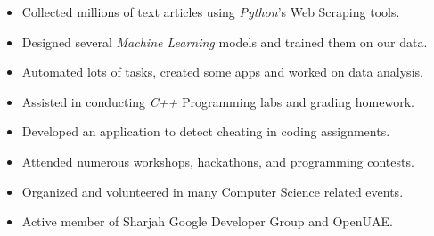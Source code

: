 \documentclass[10pt,a4paper]{altacv}
\begin{document}
\divider

\begin{itemize}
  \item Collected millions of text articles using \emph{Python}'s Web Scraping tools.
  \item Designed several \emph{Machine Learning} models and trained them on our data.
  \item Automated lots of tasks, created some apps and worked on data analysis.
\end{itemize}

\divider

\begin{itemize}
  \item Assisted in conducting \emph{C++} Programming labs and grading homework.
  \item Developed an application to detect cheating in coding assignments.
\end{itemize}
\smallskip


\projectssection
\smallskip

\begin{itemize}
  \item Attended numerous workshops, hackathons, and programming contests.
  \item Organized and volunteered in many Computer Science related events.
  \item Active member of Sharjah Google Developer Group and OpenUAE.
\end{itemize}
\end{document}
